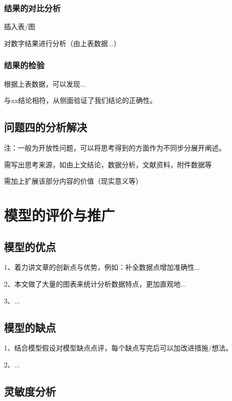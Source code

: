 \documentclass{ctexart}
\begin{document}
\subsubsection{结果的对比分析}

插入表/图

对数字结果进行分析（由上表数据...）

\subsubsection{结果的检验}
根据上表数据，可以发现...

与xx结论相符，从侧面验证了我们结论的正确性。

\subsection{问题四的分析解决}

注：一般为开放性问题，可以将思考得到的方面作为不同步分展开阐述。

需写出思考来源，如由上文结论，数据分析，文献资料，附件数据等

需加上扩展该部分内容的价值（现实意义等）










\section{模型的评价与推广}
\subsection{模型的优点}
1、着力讲文章的创新点与优势，例如：补全数据点增加准确性...

2、本文做了大量的图表来统计分析数据特点，更加直观地...

3、...

\subsection{模型的缺点}

1、结合模型假设对模型缺点点评，每个缺点写完后可以加改进措施/想法。

2、...

\subsection{灵敏度分析}
\end{document}
